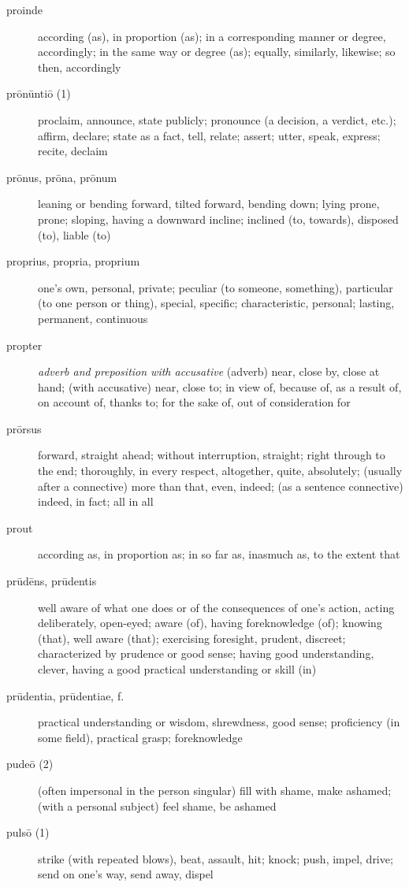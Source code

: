 \begin{description}
    \item[proinde] according (as), in proportion (as); in a corresponding manner or degree, accordingly; in the same way or degree (as); equally, similarly, likewise; so then, accordingly
    \item[prōnūntiō (1)] proclaim, announce, state publicly; pronounce (a decision, a verdict, etc.); affirm, declare; state as a fact, tell, relate; assert; utter, speak, express; recite, declaim
    \item[prōnus, prōna, prōnum] leaning or bending forward, tilted forward, bending down; lying prone, prone; sloping, having a downward incline; inclined (to, towards), disposed (to), liable (to)
    \item[proprius, propria, proprium] \marginnote{*}one's own, personal, private; peculiar (to someone, something), particular (to one person or thing), special, specific; characteristic, personal; lasting, permanent, continuous
    \item[propter] \marginnote{*}\textit{adverb and preposition with accusative} (adverb) near, close by, close at hand; (with accusative) near, close to; in view of, because of, as a result of, on account of, thanks to; for the sake of, out of consideration for
    \item[prōrsus] forward, straight ahead; without interruption, straight; right through to the end; thoroughly, in every respect, altogether, quite, absolutely; (usually after a connective) more than that, even, indeed; (as a sentence connective) indeed, in fact; all in all
    \item[prout] according as, in proportion as; in so far as, inasmuch as, to the extent that
    \item[prūdēns, prūdentis] well aware of what one does or of the consequences of one's action, acting deliberately, open-eyed; aware (of), having foreknowledge (of); knowing (that), well aware (that); exercising foresight, prudent, discreet; characterized by prudence or good sense; having good understanding, clever, having a good practical understanding or skill (in)
    \item[prūdentia, prūdentiae, f.] practical understanding or wisdom, shrewdness, good sense; proficiency (in some field), practical grasp; foreknowledge
    \item[pudeō (2)] (often impersonal in the  person singular) fill with shame, make ashamed; (with a personal subject) feel shame, be ashamed
    \item[pulsō (1)] strike (with repeated blows), beat, assault, hit; knock; push, impel, drive; send on one's way, send away, dispel

\end{description}

